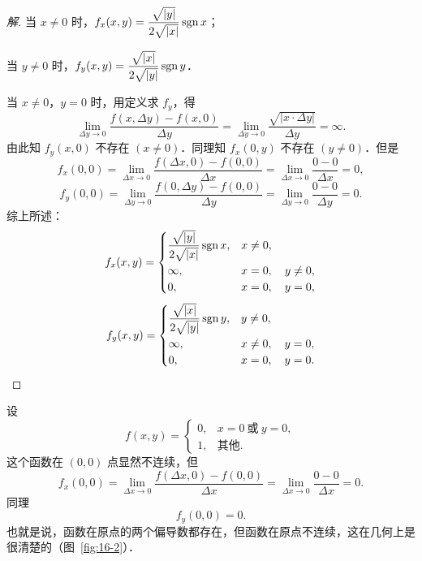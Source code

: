 \begin{proof}[解]
当 $x\neq 0$ 时，$f_{x}(x,y)=\dfrac{\sqrt{\left|y\right|}}{2\sqrt{\left|x\right|}}\operatorname{sgn} x$；

当 $y\neq 0$ 时，$f_{y}(x,y)=\dfrac{\sqrt{\left|x\right|}}{2\sqrt{\left|y\right|}}\operatorname{sgn} y$．

当 $x\neq 0$，$y=0$ 时，用定义求 $f_{y}$，得
\[
\lim_{\Delta y\to 0}\frac{f(x,\Delta y)-f(x,0)}{\Delta y}=\lim_{\Delta y\to 0}\frac{\sqrt{\left|x\cdot\Delta y\right|}}{\Delta y}=\infty.
\]
由此知 $f_{y}(x,0)$ 不存在 $(x\neq 0)$．同理知 $f_{x}(0,y)$ 不存在 $(y\neq 0)$．但是
\[
f_{x}(0,0)=\lim_{\Delta x\to 0}\frac{f(\Delta x,0)-f(0,0)}{\Delta x}=\lim_{\Delta x\to 0}\frac{0-0}{\Delta x}=0,
\]
\[
f_{y}(0,0)=\lim_{\Delta y\to 0}\frac{f(0,\Delta y)-f(0,0)}{\Delta y}=\lim_{\Delta y\to 0}\frac{0-0}{\Delta y}=0.
\]
综上所述：
\[
f_{x}(x,y)=\begin{cases}
\dfrac{\sqrt{\left|y\right|}}{2\sqrt{\left|x\right|}}\operatorname{sgn} x, & x\neq 0,\\[8pt]
\infty, & x=0,\quad y\neq 0,\\
0, & x=0,\quad y=0,
\end{cases}
\]
\[
f_{y}(x,y)=\begin{cases}
\dfrac{\sqrt{\left|x\right|}}{2\sqrt{\left|y\right|}}\operatorname{sgn} y, & y\neq 0,\\[8pt]
\infty, & x\neq 0,\quad y=0,\\
0, & x=0,\quad y=0.
\end{cases}
\]
\end{proof}

\begin{example}\label{ex:16-1-3}
设
\[
f(x,y)=\begin{cases}
0, & x=0\ \text{或}\ y=0,\\
1, & \text{其他}.
\end{cases}
\]
这个函数在 $(0,0)$ 点显然不连续，但
\[
f_{x}(0,0)=\lim_{\Delta x\to 0}\frac{f(\Delta x,0)-f(0,0)}{\Delta x}=\lim_{\Delta x\to 0}\frac{0-0}{\Delta x}=0.
\]
同理
\[
f_{y}(0,0)=0.
\]
也就是说，函数在原点的两个偏导数都存在，但函数在原点不连续，这在几何上是很清楚的（图~\ref{fig:16-2}）．
\end{example}

